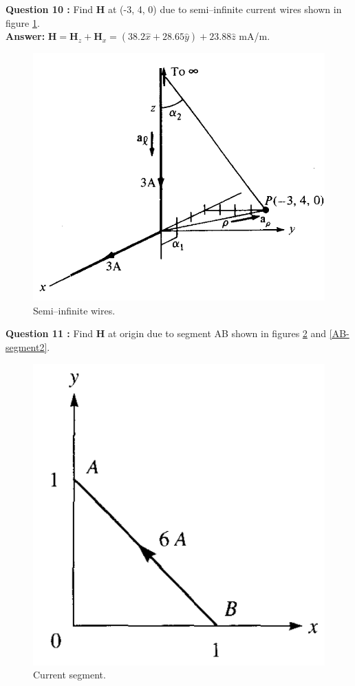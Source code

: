 \documentclass[12pt,a4paper]{article}
\begin{document}
\newpage
\noindent\textbf{Question 10 \cite[Example 7.1, page 266]{Sadiku}:} Find \textbf{H} at (-3, 4, 0) due to semi--infinite current wires shown in figure \ref{Semi-infinite-wires}.\\
\textbf{Answer: }$\textbf{H}=\textbf{H}_z+\textbf{H}_x=(38.2\hat x+28.65\hat y)+23.88\hat z$ mA/m.
\begin{figure}[H]
\centering
\includegraphics[scale=0.45]{Figure7-7aS.png}
\caption{Semi--infinite wires.}
\label{Semi-infinite-wires}
\end{figure}
\noindent\textbf{Question 11 \cite[Problem 7.3 and 7.4, page 297]{Sadiku}:} Find \textbf{H} at origin due to segment AB shown in figures \ref{AB-segment1} and \ref{AB-segment2}.\\
\begin{figure}[H]
\centering
\includegraphics[scale=0.45]{Figure7-26S.png}
\caption{Current segment.}
\label{AB-segment1}
\end{figure}
\end{document}
